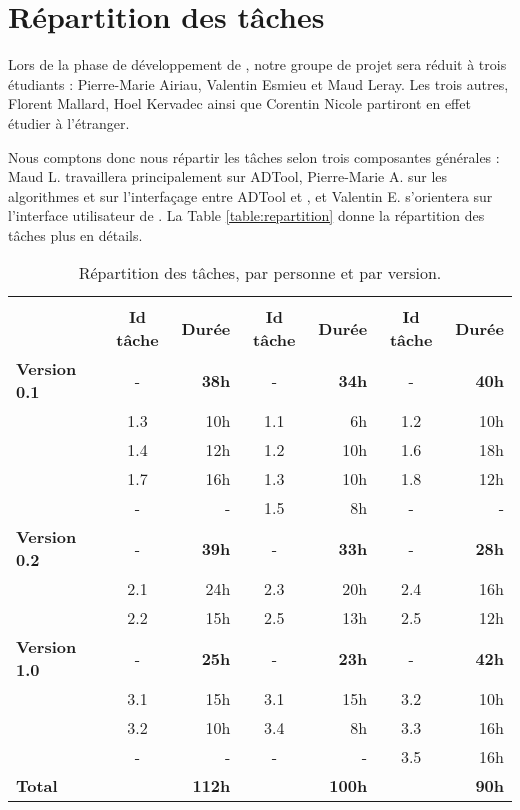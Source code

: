 \section{Répartition des tâches}
	\label{sec:repartition}

	Lors de la phase de développement de \glasir{}, notre groupe de projet sera réduit à trois étudiants : Pierre-Marie {\sc Airiau}, Valentin {\sc Esmieu} et Maud {\sc Leray}. Les trois autres, Florent {\sc Mallard}, Hoel {\sc Kervadec} ainsi que Corentin {\sc Nicole} partiront en effet étudier à l'étranger.
	
	Nous comptons donc nous répartir les tâches selon trois composantes générales : Maud L. travaillera principalement sur ADTool, Pierre-Marie A. sur les algorithmes et sur l'interfaçage entre ADTool et \glasir{}, et Valentin E. s'orientera sur l'interface utilisateur de \glasir{}. La {\sc Table} \ref{table:repartition} donne la répartition des tâches plus en détails.
		


	\begin{table}[H]
		\centering
		\begin{tabular}{|l|c|r||c|r||c|r|}
			\hline
			\multirow{2}{*}{} & \nomRepart{Pierre-Marie A.} & \nomRepart{Valentin E.} & \nomRepartt{Maud L.}\\
			\cline{2-7}
			 & {\bf Id tâche} & {\bf Durée} & {\bf Id tâche} & {\bf Durée} & {\bf Id tâche} & {\bf Durée}\\
			\hline
			{\bf Version 0.1} & - & {\bf 38h} & - & {\bf 34h} & - & {\bf 40h}\\
			 & 1.3 & 10h & 1.1 & 6h & 1.2 & 10h\\
			 & 1.4 & 12h & 1.2 & 10h & 1.6 & 18h\\
			 & 1.7 & 16h & 1.3 & 10h & 1.8 & 12h\\
			 & - & - & 1.5 & 8h & - & -\\
			\hline
			{\bf Version 0.2} & - & {\bf 39h} & - & {\bf 33h} & - & {\bf 28h}\\
			 & 2.1 & 24h & 2.3 & 20h & 2.4 & 16h\\
			 & 2.2 & 15h & 2.5 & 13h & 2.5 & 12h\\
			\hline
			{\bf Version 1.0} & - & {\bf 25h} & - & {\bf 23h} & - & {\bf 42h}\\
			 & 3.1 & 15h & 3.1 & 15h & 3.2 & 10h\\
			 & 3.2 & 10h & 3.4 & 8h & 3.3 & 16h\\
			 & - & - & - & - & 3.5 & 16h\\
			\hline
			{\bf Total} & \multicolumn{2}{r||}{{\bf 112h}} & \multicolumn{2}{r||}{{\bf 100h}} & \multicolumn{2}{r|}{{\bf 90h}}\\
			\hline
		\end{tabular}
		\caption{Répartition des tâches, par personne et par version.}
		\label{table:repartition}
		\label{tab:repartition}
	\end{table}
		